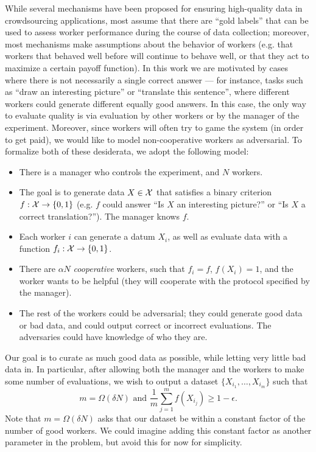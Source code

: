 \documentclass[anon,12pt]{colt2016} %
\newcommand{\goodfrac}{\alpha}
\newcommand{\quality}{\epsilon}
\begin{document}
While several mechanisms have been proposed for ensuring high-quality 
data in crowdsourcing applications, most assume that there are ``gold labels'' 
that can be used to assess worker performance during the course of 
data collection; moreover, most mechanisms make assumptions about the behavior 
of workers (e.g. that workers that behaved well before will continue to 
behave well, or that they act to maximize a certain payoff function).
In this work we are motivated by cases where there is not necessarily a single 
correct answer --- for instance, tasks such as ``draw an interesting picture'' 
or ``translate this sentence'', where different workers could generate different 
equally good answers. In this case, the only way to evaluate quality is 
via evaluation by other workers or by the manager of the experiment. 
Moreover, since workers will often try to game the system (in order to 
get paid), we would like to model non-cooperative workers as adversarial. 
To formalize both of these desiderata, we adopt the following model:
\begin{itemize}
\item There is a manager who controls the experiment, and 
      $N$ workers.
\item The goal is to generate data $X \in \mathcal{X}$ that satisfies 
      a binary criterion $f : \mathcal{X} \to \{0,1\}$ (e.g. $f$ could answer
      ``Is $X$ an interesting picture?'' or ``Is $X$ a correct translation?'').
      The manager knows $f$.
\item Each worker $i$ can generate a datum $X_i$, as well as evaluate 
      data with a function $f_i : \mathcal{X} \to \{0,1\}$.
\item There are $\goodfrac N$ \emph{cooperative} workers, such that 
      $f_i = f$, $f(X_i) = 1$, and the worker 
      wants to be helpful (they will cooperate with the protocol 
      specified by the manager).
\item The rest of the workers could be adversarial; they could generate 
      good data or bad data, and could output correct or incorrect evaluations. 
      The adversaries could have knowledge of who they are.
\end{itemize}
Our goal is to curate as much good data as possible, while letting very little 
bad data in. In particular, after allowing both the manager and the workers to 
make some number of evaluations, we wish to output a dataset 
$\{X_{i_1}, \ldots, X_{i_m}\}$ such that 
\begin{equation}
\label{eq:target}
m = \Omega(\delta N)\text{ and }\frac{1}{m} \sum_{j=1}^m f(X_{i_j}) \geq 1-\quality.
\end{equation}
Note that $m = \Omega(\delta N)$ asks that our dataset be within a constant 
factor of the number of good workers. We could imagine adding this constant 
factor as another parameter in the problem, but avoid this for now for simplicity.
\end{document}
